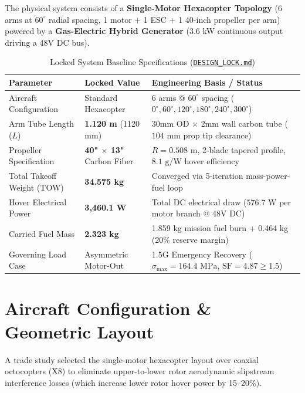\documentclass[11pt,a4paper]{article}
\begin{document}
The physical system consists of a \textbf{Single-Motor Hexacopter Topology} (6 arms at $60^\circ$ radial spacing, 1 motor + 1 ESC + 1 40-inch propeller per arm) powered by a \textbf{Gas-Electric Hybrid Generator} (3.6 kW continuous output driving a 48V DC bus).

\begin{table}[H]
    \centering
    \caption{Locked System Baseline Specifications (\href{https://github.com/Bishu-crypto/quadcopter-autonomy/blob/main/projects/heavy-lift-uav/DESIGN_LOCK.md}{\texttt{DESIGN\_LOCK.md}})}
    \begin{tabular}{lll}
        \toprule
        \textbf{Parameter} & \textbf{Locked Value} & \textbf{Engineering Basis / Status} \\
        \midrule
        Aircraft Configuration & Standard Hexacopter & 6 arms @ $60^\circ$ spacing ($0^\circ, 60^\circ, 120^\circ, 180^\circ, 240^\circ, 300^\circ$) \\
        Arm Tube Length ($L$) & \textbf{1.120 m} (1120 mm) & 30mm OD $\times$ 2mm wall carbon tube ($104\text{ mm}$ prop tip clearance) \\
        Propeller Specification & \textbf{40" $\times$ 13"} Carbon Fiber & $R = 0.508\text{ m}$, 2-blade tapered profile, $8.1\text{ g/W}$ hover efficiency \\
        Total Takeoff Weight (TOW) & \textbf{34.575 kg} & Converged via 5-iteration mass-power-fuel loop \\
        Hover Electrical Power & \textbf{3,460.1 W} & Total DC electrical draw ($576.7\text{ W}$ per motor branch @ 48V DC) \\
        Carried Fuel Mass & \textbf{2.323 kg} & 1.859 kg mission fuel burn + 0.464 kg (20\% reserve margin) \\
        Governing Load Case & Asymmetric Motor-Out & 1.5G Emergency Recovery ($\sigma_{\max} = 164.4\text{ MPa}$, $\text{SF} = 4.87 \ge 1.5$) \\
        \bottomrule
    \end{tabular}
\end{table}

\section{Aircraft Configuration \& Geometric Layout}

A trade study selected the single-motor hexacopter layout over coaxial octocopters (X8) to eliminate upper-to-lower rotor aerodynamic slipstream interference losses (which increase lower rotor hover power by 15--20\%).
\end{document}
